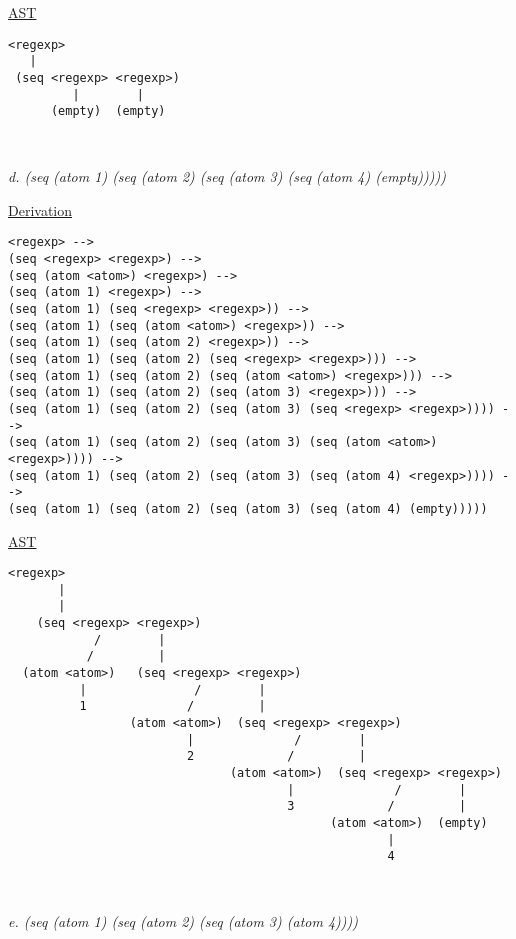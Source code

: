 \documentclass{article}
\begin{document}
\underline{AST}
\begin{lstlisting}[language=vasu]
<regexp>
   |
 (seq <regexp> <regexp>)
         |        |
      (empty)  (empty)
      
      
\end{lstlisting}
\newpage
\begin{quoting}
\textit{d. (seq (atom 1) (seq (atom 2) (seq (atom 3) (seq (atom 4) (empty)))))}
\end{quoting}

\underline{Derivation}
\begin{lstlisting}[language=vasu]
<regexp> --> 
(seq <regexp> <regexp>) -->
(seq (atom <atom>) <regexp>) -->
(seq (atom 1) <regexp>) -->
(seq (atom 1) (seq <regexp> <regexp>)) -->
(seq (atom 1) (seq (atom <atom>) <regexp>)) -->
(seq (atom 1) (seq (atom 2) <regexp>)) -->
(seq (atom 1) (seq (atom 2) (seq <regexp> <regexp>))) -->
(seq (atom 1) (seq (atom 2) (seq (atom <atom>) <regexp>))) -->
(seq (atom 1) (seq (atom 2) (seq (atom 3) <regexp>))) -->
(seq (atom 1) (seq (atom 2) (seq (atom 3) (seq <regexp> <regexp>)))) -->
(seq (atom 1) (seq (atom 2) (seq (atom 3) (seq (atom <atom>) <regexp>)))) -->
(seq (atom 1) (seq (atom 2) (seq (atom 3) (seq (atom 4) <regexp>)))) -->
(seq (atom 1) (seq (atom 2) (seq (atom 3) (seq (atom 4) (empty)))))

\end{lstlisting}

\underline{AST}
\begin{lstlisting}[language=vasu]
    <regexp>
       |
       |
    (seq <regexp> <regexp>)
            /        |
           /         |
  (atom <atom>)   (seq <regexp> <regexp>)
          |               /        |
          1              /         |
                 (atom <atom>)  (seq <regexp> <regexp>)
                         |              /        |
                         2             /         |
                               (atom <atom>)  (seq <regexp> <regexp>)
                                       |              /        |
                                       3             /         |
                                             (atom <atom>)  (empty)
                                                     |              
                                                     4                   
      
      
\end{lstlisting}

\begin{quoting}
\textit{e. (seq (atom 1) (seq (atom 2) (seq (atom 3) (atom 4))))}
\end{quoting}
\end{document}
